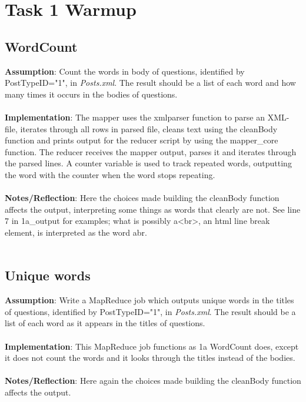\documentclass[fleqn,10pt]{wlscirep}
\begin{document}
\section{Task 1 Warmup}
\subsection{WordCount}
\textbf{Assumption}: Count the words in body of questions, identified by PostTypeID="1", in \textit{Posts.xml}. The result should be a list of each word and how many times it occurs in the bodies of questions. \\ \\
\textbf{Implementation}: The mapper uses the xmlparser function to parse an XML-file, iterates through all rows in parsed file, cleans text using the cleanBody function and prints output for the reducer script by using the mapper\_core function.
The reducer receives the mapper output, parses it and iterates through the parsed lines. A counter variable is used to track repeated words, outputting the word with the counter when the word stops repeating. \\ \\
\textbf{Notes/Reflection}: Here the choices made building the cleanBody function affects the output, interpreting some things as words that clearly are not. See line 7 in 1a\_output for examples; what is possibly a<br>, an html line break element, is interpreted as the word abr. \\ \\



\subsection{Unique words}
\textbf{Assumption}: Write a MapReduce job which outputs unique words in the titles of questions, identified by PostTypeID="1", in \textit{Posts.xml}. The result should be a list of each word as it appears in the titles of questions. \\ \\
\textbf{Implementation}: This MapReduce job functions as 1a WordCount does, except it does not count the words and it looks through the titles instead of the bodies. \\ \\
\textbf{Notes/Reflection}: Here again the choices made building the cleanBody function affects the output.

\end{document}

